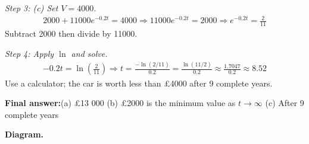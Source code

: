 \documentclass[11pt]{article}
\begin{document}
\textit{Step 3: (c) Set \( V = 4000 \).}
\[\begin{gathered}
2000 + 11000e^{-0.2t} = 4000 \Rightarrow 11000e^{-0.2t} = 2000 \Rightarrow e^{-0.2t} = \frac{2}{11}
\end{gathered}\]
Subtract 2000 then divide by 11000.

\textit{Step 4: Apply \( \ln \) and solve.}
\[\begin{gathered}
-0.2t = \ln\!\left(\frac{2}{11}\right) \Rightarrow t = \frac{-\ln(2/11)}{0.2} = \frac{\ln(11/2)}{0.2} \approx \frac{1.7047}{0.2} \approx 8.52
\end{gathered}\]
Use a calculator; the car is worth less than \pounds 4000 after 9 complete years.

\begin{answerbox}
\textbf{Final answer:}\quad (a) \pounds 13 000 \quad  (b) \pounds 2000 is the minimum value as \(\displaystyle  t \to \infty \) \quad  (c) After 9 complete years
\end{answerbox}
\textbf{Diagram.}
\end{document}
